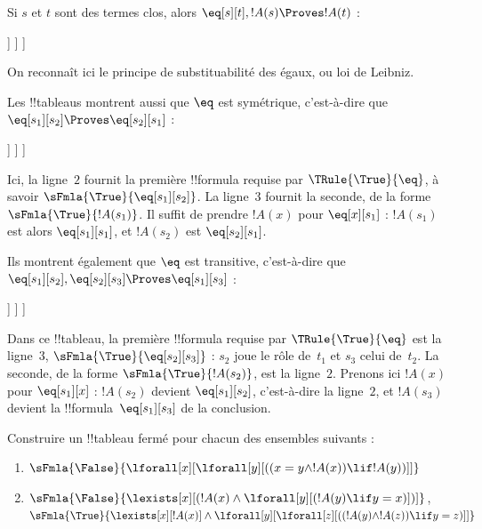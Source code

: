\documentclass[../../../include/open-logic-section]{subfiles}
\begin{document}
\begin{ex}
Si $s$ et $t$ sont des termes clos, alors
$\eq[s][t], !A(s) \Proves !A(t)$ :
\begin{oltableau}
  [\sFmla{\False}{\formula{A}(t)}, just = \TAss
    [\sFmla{\True}{\eq[s][t]}, just = \TAss
      [\sFmla{\True}{\formula{A}(s)}, just = \TAss
        [\sFmla{\True}{\formula{A}(t)}, just={\TRule{\True}{\eq}[2, 3]}, close]
      ]
    ]
  ]
\end{oltableau}
On reconnaît ici le principe de substituabilité des égaux,
ou loi de Leibniz.

Les !!{tableau}s montrent aussi que $\eq$ est symétrique, c'est-à-dire
que $\eq[s_1][s_2] \Proves \eq[s_2][s_1]$ :
\begin{oltableau}
  [\sFmla{\False}{\eq[s_2][s_1]}, just = \TAss
    [\sFmla{\True}{\eq[s_1][s_2]}, just = \TAss
      [\sFmla{\True}{\eq[s_1][s_1]}, just = {$\eq$}
        [\sFmla{\True}{\eq[s_2][s_1]}, just = {\TRule{\True}{\eq}[2, 3]}, close]
      ]
    ]
  ]
\end{oltableau}
Ici, la ligne~$2$ fournit la première !!{formula} requise par
$\TRule{\True}{\eq}$, à savoir
$\sFmla{\True}{\eq[s_1][s_2]}$. La ligne~$3$ fournit la seconde, de la
forme $\sFmla{\True}{!A(s_1)}$. Il suffit de prendre $!A(x)$ pour
$\eq[x][s_1]$ : $!A(s_1)$ est alors $\eq[s_1][s_1]$, et $!A(s_2)$
est $\eq[s_2][s_1]$.

Ils montrent également que $\eq$ est transitive, c'est-à-dire que
$\eq[s_1][s_2], \eq[s_2][s_3] \Proves \eq[s_1][s_3]$ :
\begin{oltableau}
  [\sFmla{\False}{\eq[s_1][s_3]}, just = \TAss
    [\sFmla{\True}{\eq[s_1][s_2]}, just = \TAss
      [\sFmla{\True}{\eq[s_2][s_3]}, just = \TAss
        [\sFmla{\True}{\eq[s_1][s_3]}, just = {\TRule{\True}{\eq}[3, 2]}, close]
      ]
    ]
  ]
\end{oltableau}
Dans ce !!{tableau}, la première !!{formula} requise par
$\TRule{\True}{\eq}$ est la ligne~$3$,
$\sFmla{\True}{\eq[s_2][s_3]}$ : $s_2$ joue le rôle de~$t_1$ et
$s_3$ celui de~$t_2$. La seconde, de la forme
$\sFmla{\True}{!A(s_2)}$, est la ligne~$2$. Prenons ici $!A(x)$ pour
$\eq[s_1][x]$ : $!A(s_2)$ devient $\eq[s_1][s_2]$, c'est-à-dire la
ligne~$2$, et $!A(s_3)$ devient la !!{formula}~$\eq[s_1][s_3]$ de la
conclusion.
\end{ex}

%
%
%
%
%
%
%
%

\begin{prob}
Construire un !!{tableau} fermé pour chacun des ensembles suivants :
\begin{enumerate}
\item $\sFmla{\False}{\lforall[x][\lforall[y][((x = y \land !A(x))
      \lif !A(y))]]}$
\item $\sFmla{\False}{\lexists[x][(!A(x) \land
    \lforall[y][(!A(y) \lif y = x)])]}$,\\
  $\sFmla{\True}{\lexists[x][!A(x)] \land
    \lforall[y][\lforall[z][((!A(y) \land !A(z)) \lif y = z)]]}$
\end{enumerate}
\end{prob}
\end{document}
